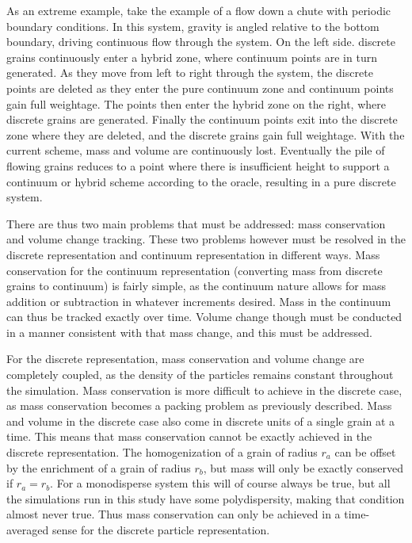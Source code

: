 As an extreme example, take the example of a flow down a chute with periodic boundary conditions. In this system, gravity is angled relative to the bottom boundary, driving continuous flow through the system. On the left side. discrete grains continuously enter a hybrid zone, where continuum points are in turn generated. As they move from left to right through the system, the discrete points are deleted as they enter the pure continuum zone and continuum points gain full weightage. The points then enter the hybrid zone on the right, where discrete grains are generated. Finally the continuum points exit into the discrete zone where they are deleted, and the discrete grains gain full weightage. With the current scheme, mass and volume are continuously lost. Eventually the pile of flowing grains reduces to a point where there is insufficient height to support a continuum or hybrid scheme according to the oracle, resulting in a pure discrete system.

There are thus two main problems that must be addressed: mass conservation and volume change tracking. These two problems however must be resolved in the discrete representation and continuum representation in different ways. Mass conservation for the continuum representation (converting mass from discrete grains to continuum) is fairly simple, as the continuum nature allows for mass addition or subtraction in whatever increments desired. Mass in the continuum can thus be tracked exactly over time. Volume change though must be conducted in a manner consistent with that mass change, and this must be addressed. 

For the discrete representation, mass conservation and volume change are completely coupled, as the density of the particles remains constant throughout the simulation. Mass conservation is more difficult to achieve in the discrete case, as mass conservation becomes a packing problem as previously described. Mass and volume in the discrete case also come in discrete units of a single grain at a time. This means that mass conservation cannot be exactly achieved in the discrete representation. The homogenization of a grain of radius $r_a$ can be offset by the enrichment of a grain of radius $r_b$, but mass will only be exactly conserved if $r_a = r_b$. For a monodisperse system this will of course always be true, but all the simulations run in this study have some polydispersity, making that condition almost never true. Thus mass conservation can only be achieved in a time-averaged sense for the discrete particle representation.

